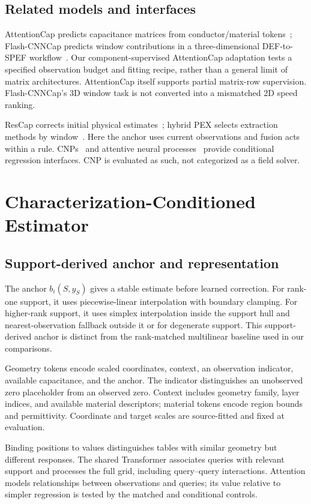 \documentclass[conference,9pt,letterpaper]{IEEEtran}
\begin{document}
\subsection{Related models and interfaces}
AttentionCap predicts capacitance matrices from conductor/material tokens~\cite{attentioncap}; Flash-CNNCap predicts window contributions in a three-dimensional DEF-to-SPEF workflow~\cite{flash}. Our component-supervised AttentionCap adaptation tests a specified observation budget and fitting recipe, rather than a general limit of matrix architectures. AttentionCap itself supports partial matrix-row supervision. Flash-CNNCap's 3D window task is not converted into a mismatched 2D speed ranking.

ResCap corrects initial physical estimates~\cite{rescap}; hybrid PEX selects extraction methods by window~\cite{hybrid}. Here the anchor uses current observations and fusion acts within a rule. CNPs~\cite{cnp} and attentive neural processes~\cite{anp} provide conditional regression interfaces. CNP is evaluated as such, not categorized as a field solver.

\section{Characterization-Conditioned Estimator}

\subsection{Support-derived anchor and representation}
The anchor $b_i(S,y_S)$ gives a stable estimate before learned correction. For rank-one support, it uses piecewise-linear interpolation with boundary clamping. For higher-rank support, it uses simplex interpolation inside the support hull and nearest-observation fallback outside it or for degenerate support. This support-derived anchor is distinct from the rank-matched multilinear baseline used in our comparisons.

Geometry tokens encode scaled coordinates, context, an observation indicator, available capacitance, and the anchor. The indicator distinguishes an unobserved zero placeholder from an observed zero. Context includes geometry family, layer indices, and available material descriptors; material tokens encode region bounds and permittivity. Coordinate and target scales are source-fitted and fixed at evaluation.

Binding positions to values distinguishes tables with similar geometry but different responses. The shared Transformer associates queries with relevant support and processes the full grid, including query--query interactions. Attention models relationships between observations and queries; its value relative to simpler regression is tested by the matched and conditional controls.
\end{document}
